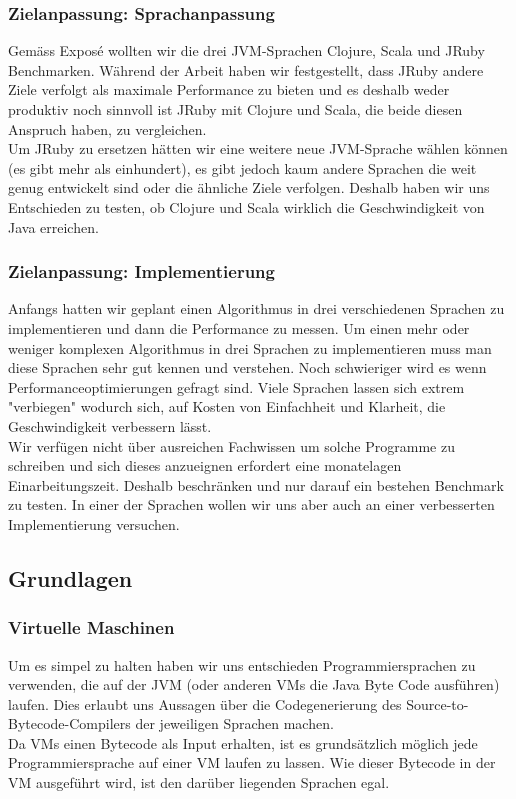 \documentclass{fancydocument}
\begin{document}
\subsubsection{Zielanpassung: Sprachanpassung}

Gemäss Exposé wollten wir die drei JVM-Sprachen Clojure, Scala und JRuby
Benchmarken. W\"ahrend der Arbeit haben wir
festgestellt, dass JRuby andere Ziele verfolgt als maximale
Performance zu bieten und es deshalb weder produktiv noch sinnvoll ist
JRuby mit Clojure und Scala, die beide diesen Anspruch haben, zu
vergleichen.
\\
Um JRuby zu ersetzen h\"atten wir eine weitere neue JVM-Sprache
wählen k\"onnen (es gibt mehr als einhundert), es gibt jedoch kaum andere
Sprachen die weit genug entwickelt sind oder die \"ahnliche Ziele
verfolgen. Deshalb haben wir uns Entschieden zu testen, ob
Clojure und Scala wirklich die Geschwindigkeit von Java erreichen.

\subsubsection{Zielanpassung: Implementierung}

Anfangs hatten wir geplant einen Algorithmus in drei verschiedenen Sprachen zu
implementieren und dann die Performance zu messen. Um einen mehr oder
weniger komplexen Algorithmus in drei Sprachen zu implementieren muss
man diese Sprachen sehr gut kennen und verstehen. Noch schwieriger
wird es wenn Performanceoptimierungen gefragt sind. Viele
Sprachen lassen sich extrem "verbiegen"  wodurch sich, auf Kosten von
Einfachheit und Klarheit, die Geschwindigkeit verbessern lässt.
\\
Wir verfügen nicht über ausreichen Fachwissen um solche Programme zu schreiben und sich dieses
anzueignen erfordert eine monatelagen Einarbeitungszeit. Deshalb
beschränken und nur darauf ein bestehen Benchmark zu testen. In einer
der Sprachen wollen wir uns aber auch an einer verbesserten
Implementierung versuchen.

\subsection{Grundlagen}

\subsubsection{Virtuelle Maschinen}

Um es simpel zu halten haben wir uns entschieden
Programmiersprachen zu verwenden, die auf der JVM (oder anderen VMs die
Java Byte Code ausf\"uhren) laufen. Dies erlaubt uns Aussagen \"uber die
Codegenerierung des Source-to-Bytecode-Compilers der jeweiligen Sprachen
machen.
\\
Da VMs einen Bytecode als Input erhalten, ist es grunds\"atzlich m\"oglich
jede Programmiersprache auf einer VM laufen zu lassen. Wie dieser
Bytecode in der VM ausgef\"uhrt wird, ist den dar\"uber liegenden Sprachen
egal.\\ 
\end{document}
